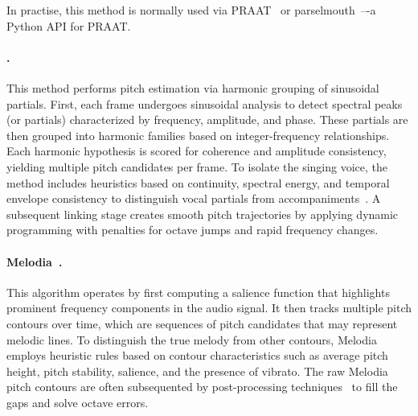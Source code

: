 In practise, this method is normally used via PRAAT~\citep{boersma-praat} or parselmouth~\citep{jadoul-parselmouth}–-a Python API for PRAAT.






\paragraph*{\citep{rao-pitch}.}
This method performs pitch estimation via harmonic grouping of sinusoidal partials. First, each frame undergoes sinusoidal analysis to detect spectral peaks (or partials) characterized by frequency, amplitude, and phase. These partials are then grouped into harmonic families based on integer-frequency relationships. Each harmonic hypothesis is scored for coherence and amplitude consistency, yielding multiple pitch candidates per frame. To isolate the singing voice, the method includes heuristics based on continuity, spectral energy, and temporal envelope consistency to distinguish vocal partials from accompaniments~\citep{rao-pitch_postprocessing}. A subsequent linking stage creates smooth pitch trajectories by applying dynamic programming with penalties for octave jumps and rapid frequency changes.
 

\paragraph*{Melodia~\citep{salamon-melodia}.}
This algorithm operates by first computing a salience function that highlights prominent frequency components in the audio signal. It then tracks multiple pitch contours over time, which are sequences of pitch candidates that may represent melodic lines. To distinguish the true melody from other contours, Melodia employs heuristic rules based on contour characteristics such as average pitch height, pitch stability, salience, and the presence of vibrato. The raw Melodia pitch contours are often subsequented by post-processing techniques~\citep{gulati-thesis,ganguli-structures} to fill the gaps and solve octave errors.



